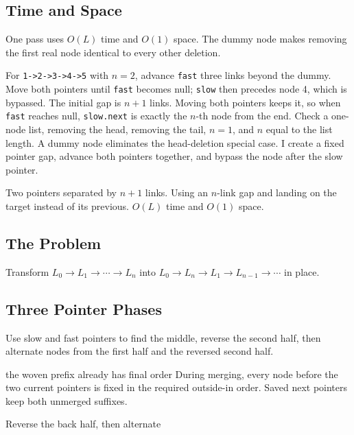 \subsection{Time and Space}
One pass uses \(O(L)\) time and \(O(1)\) space. The dummy node makes removing
the first real node identical to every other deletion.

\lessonexpansion
  {For \texttt{1->2->3->4->5} with \(n=2\), advance \texttt{fast} three
   links beyond the dummy. Move both pointers until \texttt{fast} becomes
   null; \texttt{slow} then precedes node 4, which is bypassed.}
  {The initial gap is \(n+1\) links. Moving both pointers keeps it, so
   when \texttt{fast} reaches null, \texttt{slow.next} is exactly the
   \(n\)-th node from the end.}
  {Check a one-node list, removing the head, removing the tail, \(n=1\), and
   \(n\) equal to the list length.}
  {A dummy node eliminates the head-deletion special case. I create a fixed
   pointer gap, advance both pointers together, and bypass the node after the
   slow pointer.}

  {Two pointers separated by $n+1$ links.}
  {Using an $n$-link gap and landing on the target instead of its previous.}
  {$O(L)$ time and $O(1)$ space.}



\subsection{The Problem}
Transform \(L_0\to L_1\to\cdots\to L_n\) into
\(L_0\to L_n\to L_1\to L_{n-1}\to\cdots\) in place.

\subsection{Three Pointer Phases}
Use slow and fast pointers to find the middle, reverse the second half, then
alternate nodes from the first half and the reversed second half.

\begin{invariantbox}{the woven prefix already has final order}
During merging, every node before the two current pointers is fixed in the
required outside-in order. Saved next pointers keep both unmerged suffixes.
\end{invariantbox}

\begin{visualbox}{Reverse the back half, then alternate}
\centering
{}
\end{visualbox}

